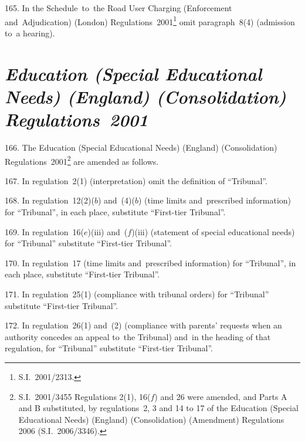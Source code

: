 \documentclass[12pt,a4paper]{article}
\begin{document}
165.  In the Schedule~to~the Road User Charging (Enforcement and~Adjudication) (London) Regulations~2001\footnote{S.I.~2001/2313.} omit paragraph~8(4) (admission to~a hearing).

\section*{\itshape Education (Special Educational Needs) (England) (Consolidation) Regulations~2001}

166.  The Education (Special Educational Needs) (England) (Consolidation) Regulations~2001\footnote{S.I.~2001/3455 Regulations 2(1), 16($f$) and 26 were amended, and Parts A and B substituted, by regulations~2, 3 and 14 to 17 of the Education (Special Educational Needs) (England) (Consolidation) (Amendment) Regulations 2006 (S.I.~2006/3346).} are amended as follows.

\medskip

167.  In regulation~2(1) (interpretation) omit the definition of “Tribunal”.

\medskip

168.  In regulation~12(2)($b$)  and~(4)($b$)  (time limits and~prescribed information) for “Tribunal”, in each place, substitute “First-tier Tribunal”.

\medskip

169.  In regulation~16($e$)(iii)  and~($f$)(iii)  (statement of special educational needs) for “Tribunal” substitute “First-tier Tribunal”.

\medskip

170.  In regulation~17 (time limits and~prescribed information) for “Tribunal”, in each place, substitute “First-tier Tribunal”.

\medskip

171.  In regulation~25(1) (compliance with tribunal orders) for “Tribunal” substitute “First-tier Tribunal”.

\medskip

172.  In regulation~26(1) and~(2) (compliance with parents’ requests when an authority concedes an appeal to~the Tribunal) and~in the heading of that regulation, for “Tribunal” substitute “First-tier Tribunal”.

\medskip
\end{document}
